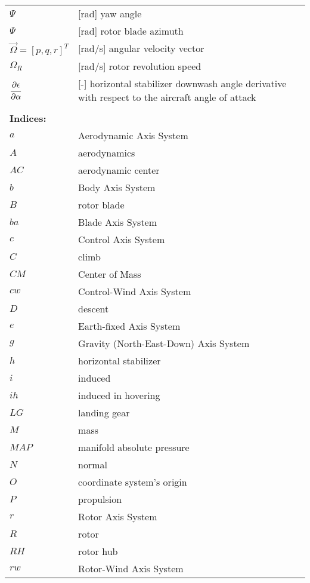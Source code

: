 \begin{longtable}[l]{ l p{} }
  $\Psi$                                       & [rad] yaw angle \\
  $\Psi$                                       & [rad] rotor blade azimuth \\
  $\vec \Omega=\left[ p, q, r \right]^T$       & [rad/s] angular velocity vector \\
  $\Omega_R$                                   & [rad/s] rotor revolution speed \\
  $\cfrac{\partial \epsilon}{\partial \alpha}$ & [-] horizontal stabilizer downwash angle derivative with respect to the aircraft angle of attack \\
  & \\
  \multicolumn{2}{l}{\textbf{Indices:}} \\
  $a$   & Aerodynamic Axis System \\
  $A$   & aerodynamics \\
  $AC$  & aerodynamic center \\
  $b$   & Body Axis System \\
  $B$   & rotor blade \\
  $ba$  & Blade Axis System \\
  $c$   & Control Axis System \\
  $C$   & climb \\
  $CM$  & Center of Mass \\
  $cw$  & Control-Wind Axis System \\
  $D$   & descent \\
  $e$   & Earth-fixed Axis System \\
  $g$   & Gravity (North-East-Down) Axis System \\
  $h$   & horizontal stabilizer \\
  $i$   & induced \\
  $ih$  & induced in hovering \\
  $LG$  & landing gear \\
  $M$   & mass \\
  $MAP$ & manifold absolute pressure \\
  $N$   & normal \\
  $O$   & coordinate system’s origin \\
  $P$   & propulsion \\
  $r$   & Rotor Axis System \\
  $R$   & rotor \\
  $RH$  & rotor hub \\
  $rw$  & Rotor-Wind Axis System \\

\end{longtable}
